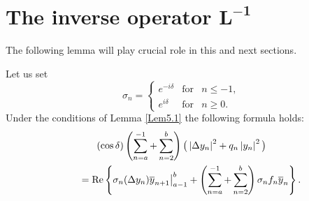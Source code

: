 \section[The inverse operator $L^{-1}$]{The inverse operator $\boldsymbol{L^{-1}}$}\label{section6}

The following lemma will play crucial role in this and next sections.

\begin{lemma}
\label{Lem6.1} Let us set%
\begin{equation}
\sigma _{n}=\left\{
\begin{array}{lll}
e^{-i\delta } & \text{for} & n\leq -1, \\
e^{i\delta } & \text{for} & n\geq 0.%
\end{array}%
\right.  \label{6.1}
\end{equation}%
Under the conditions of Lemma {\rm \ref{Lem5.1}} the following formula holds:%
\begin{gather}
(\cos \delta )\left( \sum_{n=a}^{-1}+\sum_{n=2}^{b}\right) \big(
\left\vert \Delta y_{n}\right\vert ^{2}+q_{n}\left\vert y_{n}\right\vert
^{2}\big)  \nonumber \\
\qquad ={\rm Re}\left\{ \sigma _{n}(\Delta y_{n})\overline{y}_{n+1}\big|
_{a-1}^{b}+\left( \sum_{n=a}^{-1}+\sum_{n=2}^{b}\right) \sigma _{n}f_{n}%
\overline{y}_{n}\right\} .  \label{6.2}
\end{gather}
\end{lemma}


